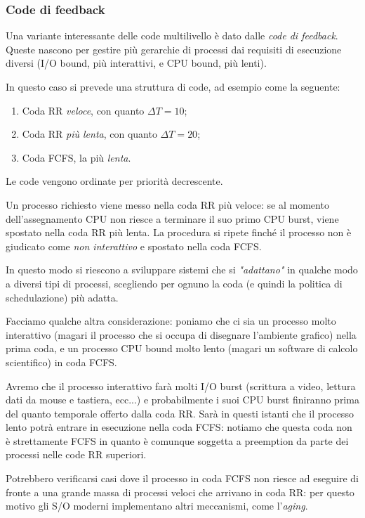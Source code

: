\documentclass[a4paper,11pt]{article}
\begin{document}
\subsubsection{Code di feedback}
Una variante interessante delle code multilivello è dato dalle \textit{code di feedback}.
Queste nascono per gestire più gerarchie di processi dai requisiti di esecuzione diversi (I/O bound, più interattivi, e CPU bound, più lenti).

In questo caso si prevede una struttura di code, ad esempio come la seguente:
\begin{enumerate}
	\item Coda RR \textit{veloce}, con quanto $\Delta T = 10$;
	\item Coda RR \textit{più lenta}, con quanto $\Delta T = 20$;
	\item Coda FCFS, la più \textit{lenta}.
\end{enumerate}
Le code vengono ordinate per priorità decrescente.

Un processo richiesto viene messo nella coda RR più veloce: se al momento dell'assegnamento CPU non riesce a terminare il suo primo CPU burst, viene spostato nella coda RR più lenta.
La procedura si ripete finché il processo non è giudicato come \textit{non interattivo} e spostato nella coda FCFS.

In questo modo si riescono a sviluppare sistemi che si \textit{"adattano"} in qualche modo a diversi tipi di processi, scegliendo per ognuno la coda (e quindi la politica di schedulazione) più adatta.

Facciamo qualche altra considerazione: poniamo che ci sia un processo molto interattivo (magari il processo che si occupa di disegnare l'ambiente grafico) nella prima coda, e un processo CPU bound molto lento (magari un software di calcolo scientifico) in coda FCFS.

Avremo che il processo interattivo farà molti I/O burst (scrittura a video, lettura dati da mouse e tastiera, ecc...) e probabilmente i suoi CPU burst finiranno prima del quanto temporale offerto dalla coda RR.
Sarà in questi istanti che il processo lento potrà entrare in esecuzione nella coda FCFS: notiamo che questa coda non è strettamente FCFS in quanto è comunque soggetta a preemption da parte dei processi nelle code RR superiori.

Potrebbero verificarsi casi dove il processo in coda FCFS non riesce ad eseguire di fronte a una grande massa di processi veloci che arrivano in coda RR: per questo motivo gli S/O moderni implementano altri meccanismi, come l'\textit{aging}.
\end{document}
